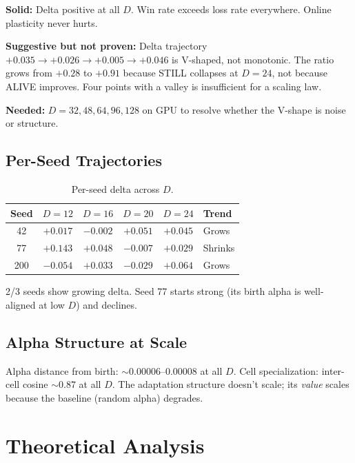 \documentclass[11pt,a4paper]{article}
\begin{document}
\textbf{Solid:} Delta positive at all $D$. Win rate exceeds loss rate everywhere. Online plasticity never hurts.

\textbf{Suggestive but not proven:} Delta trajectory $+0.035 \to +0.026 \to +0.005 \to +0.046$ is V-shaped, not monotonic. The ratio grows from $+0.28$ to $+0.91$ because STILL collapses at $D{=}24$, not because ALIVE improves. Four points with a valley is insufficient for a scaling law.

\textbf{Needed:} $D{=}32, 48, 64, 96, 128$ on GPU to resolve whether the V-shape is noise or structure.

\subsection{Per-Seed Trajectories}

\begin{table}[h]
\centering
\caption{Per-seed delta across $D$.}
\label{tab:perseed}
\begin{tabular}{cccccl}
\toprule
Seed & $D{=}12$ & $D{=}16$ & $D{=}20$ & $D{=}24$ & Trend \\
\midrule
42 & $+0.017$ & $-0.002$ & $+0.051$ & $+0.045$ & Grows \\
77 & $+0.143$ & $+0.048$ & $-0.007$ & $+0.029$ & Shrinks \\
200 & $-0.054$ & $+0.033$ & $-0.029$ & $+0.064$ & Grows \\
\bottomrule
\end{tabular}
\end{table}

2/3 seeds show growing delta. Seed 77 starts strong (its birth alpha is well-aligned at low $D$) and declines.

\subsection{Alpha Structure at Scale}

Alpha distance from birth: ${\sim}0.00006$--$0.00008$ at all $D$. Cell specialization: inter-cell cosine ${\sim}0.87$ at all $D$. The adaptation structure doesn't scale; its \emph{value} scales because the baseline (random alpha) degrades.

\section{Theoretical Analysis}
\label{sec:theory}
\end{document}
